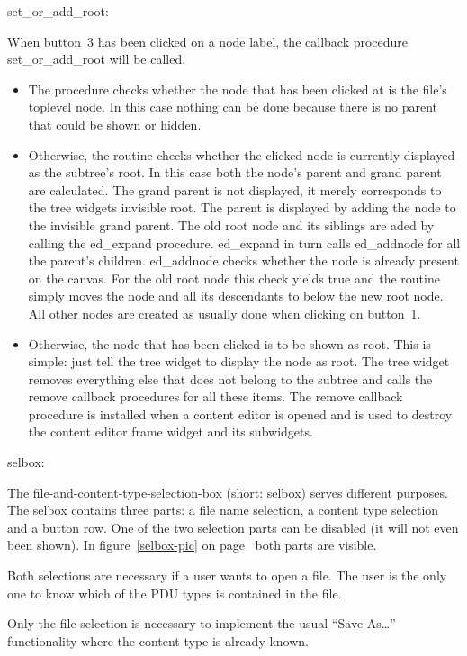 set\_or\_add\_root:

When button~3 has been clicked on a node label, the callback procedure {\Tcl set\_or\_add\_root} will be called.

\begin{itemize}
  \item
    The procedure checks whether the node that has been clicked at is the file's toplevel node.
    In this case nothing can be done because there is no parent that could be shown or hidden.
  \item
    Otherwise, the routine checks whether the clicked node is currently displayed as the subtree's root.
    In this case both the node's parent and grand parent are calculated.
    The grand parent is not displayed, it merely corresponds to the tree widgets invisible root.
    The parent is displayed by adding the node to the invisible grand parent.
    The old root node and its siblings are aded by calling the {\Tcl ed\_expand} procedure.
    {\Tcl ed\_expand} in turn calls {\Tcl ed\_addnode} for all the parent's children.
    {\Tcl ed\_addnode} checks whether the node is already present on the canvas.
    For the old root node this check yields true and the routine simply moves the node and all its descendants to below the new root node.
    All other nodes are created as usually done when clicking on button~1.
  \item
    Otherwise, the node that has been clicked is to be shown as root.
    This is simple: just tell the tree widget to display the node as root.
    The tree widget removes everything else that does not belong to the subtree and calls the remove callback procedures for all these items.
    The remove callback procedure is installed when a content editor is opened and is used to destroy the content editor frame widget and its subwidgets.
\end{itemize}

selbox:

The file-and-content-type-selection-box (short: selbox) serves different purposes.
The selbox contains three parts: a file name selection, a content type selection and a button row.
One of the two selection parts can be disabled (it will not even been shown).
In figure~\ref{selbox-pic} on page~\pageref{selbox-pic} both parts are visible.

Both selections are necessary if a user wants to open a file.
The user is the only one to know which of the PDU types is contained in the file.

Only the file selection is necessary to implement the usual ``Save As\dots'' functionality where the content type is already known.


